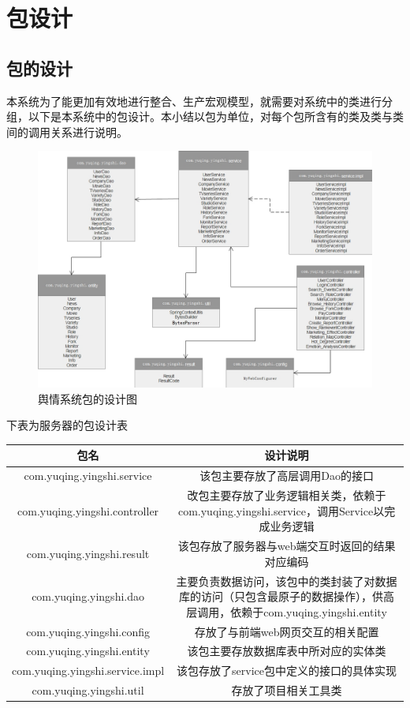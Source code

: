 \section{包设计}
\subsection{包的设计}
本系统为了能更加有效地进行整合、生产宏观模型，就需要对系统中的类进行分组，以下是本系统中的包设计。本小结以包为单位，对每个包所含有的类及类与类间的调用关系进行说明。
\begin{figure}[!htbp]
	\centering
	\includegraphics[scale=0.4]{image/o2.png}
	\caption{舆情系统包的设计图}
\end{figure}

下表为服务器的包设计表
\begin{tabular}{c c|} 
包名 & 
\multicolumn{2}{c}{设计说明} \\ 
\hline 
com.yuqing.yingshi.service & 该包主要存放了高层调用Dao的接口\\
com.yuqing.yingshi.controller & 改包主要存放了业务逻辑相关类，依赖于com.yuqing.yingshi.service，调用Service以完成业务逻辑\\
com.yuqing.yingshi.result& 该包存放了服务器与web端交互时返回的结果对应编码\\
com.yuqing.yingshi.dao&主要负责数据访问，该包中的类封装了对数据库的访问（只包含最原子的数据操作），供高层调用，依赖于com.yuqing.yingshi.entity\\
com.yuqing.yingshi.config& 存放了与前端web网页交互的相关配置\\
com.yuqing.yingshi.entity&该包主要存放数据库表中所对应的实体类\\
com.yuqing.yingshi.service.impl&该包存放了service包中定义的接口的具体实现\\
com.yuqing.yingshi.util&存放了项目相关工具类\\
\end{tabular}


